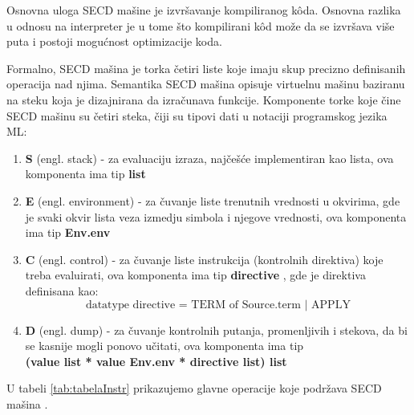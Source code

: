 Osnovna uloga SECD mašine je izvršavanje kompiliranog k\^ oda. Osnovna razlika u odnosu na interpreter je u tome što kompilirani k\^ od može da se izvršava više puta i postoji mogućnost optimizacije koda. 

Formalno, SECD mašina je torka četiri liste koje imaju skup precizno definisanih operacija nad njima. Semantika SECD mašina opisuje virtuelnu mašinu baziranu na steku koja je dizajnirana da izračunava funkcije. Komponente torke koje čine SECD mašinu su četiri steka, čiji su tipovi dati u notaciji programskog jezika ML:
\begin{enumerate}
\item {\bf S} (engl. stack) - za evaluaciju izraza, najčešće implementiran kao lista, ova komponenta ima tip {\bf list}  
\item {\bf E} (engl. environment) - za čuvanje liste trenutnih vrednosti u okvirima, gde je svaki okvir lista veza izmedju simbola i njegove vrednosti, ova komponenta ima tip {\bf Env.env}  
\item {\bf C} (engl. control) - za čuvanje liste instrukcija (kontrolnih direktiva) koje treba evaluirati, ova komponenta ima tip {\bf directive} , gde je direktiva definisana kao: $$ \text{datatype directive = TERM of Source.term | APPLY} $$
\item {\bf D} (engl. dump) - za čuvanje kontrolnih putanja, promenljivih i stekova, da bi se kasnije mogli ponovo učitati, ova komponenta ima tip\\ {\bf(value list * value Env.env * directive list) list}
\end{enumerate}

\noindent U tabeli \ref{tab:tabelaInstr} prikazujemo glavne operacije koje podržava SECD mašina \cite{introduction-fp-systems}. \\

